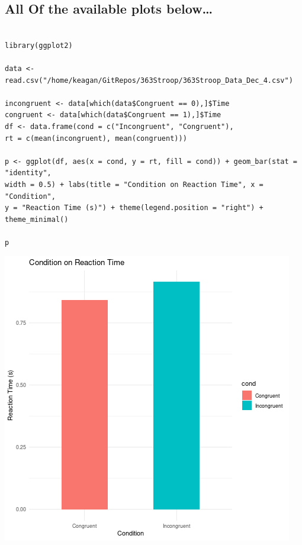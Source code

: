 \documentclass{article}
\begin{document}
\subsection{All Of the available plots below\ldots{}}
\label{sec:org211267f}

\begin{verbatim}

library(ggplot2)

data <- read.csv("/home/keagan/GitRepos/363Stroop/363Stroop_Data_Dec_4.csv")

incongruent <- data[which(data$Congruent == 0),]$Time
congruent <- data[which(data$Congruent == 1),]$Time
df <- data.frame(cond = c("Incongruent", "Congruent"), 
rt = c(mean(incongruent), mean(congruent)))

p <- ggplot(df, aes(x = cond, y = rt, fill = cond)) + geom_bar(stat = "identity", 
width = 0.5) + labs(title = "Condition on Reaction Time", x = "Condition",
y = "Reaction Time (s)") + theme(legend.position = "right") + theme_minimal()

p
\end{verbatim}

\begin{center}
\includegraphics[width=.9\linewidth]{barplot_stroop.png}
\end{center}
\end{document}
